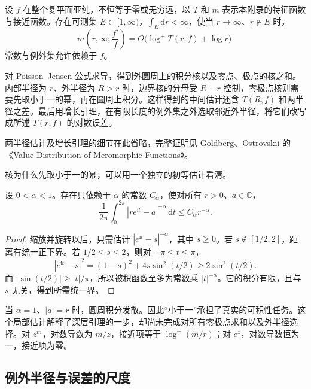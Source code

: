 \begin{lemma}\label{b3:lem:C-logarithmic-derivative}
设 \(f\) 在整个复平面亚纯，不恒等于零或无穷远，以 \(T\) 和 \(m\) 表示本附录的特征函数与接近函数。存在可测集 \(E\subset[1,\infty)\)，\(\int_E\mathrm{d}r<\infty\)，使当 \(r\to\infty\)、\(r\notin E\) 时，
\[
 m\left(r,\infty;\frac{f'}f\right)
 =O\bigl(\log^+T(r,f)+\log r\bigr).
\]
常数与例外集允许依赖于 \(f\)。
\end{lemma}
\begin{proofsketch}
对 Poisson--Jensen 公式求导，得到外圆周上的积分核以及零点、极点的核之和。内部半径为 \(r\)、外半径为 \(R>r\) 时，边界核的分母受 \(R-r\) 控制，零极点核则需要先取小于一的幂，再在圆周上积分。这样得到的中间估计还含 \(T(R,f)\) 和两半径之差。最后用增长引理，在有限长度的例外集之外选取邻近外半径，将它们改写成所述 \(T(r,f)\) 的对数误差。

两半径估计及增长引理的细节在此省略，完整证明见 Goldberg、Ostrovskii 的《Value Distribution of Meromorphic Functions》\cite[pp.~91--93]{GoldbergOstrovskii2008Value}。
\end{proofsketch}

核为什么先取小于一的幂，可以用一个独立的初等估计看清。

\begin{lemma}[圆周上的弱奇性]\label{b3:lem:C-circle-singularity}
设 \(0<\alpha<1\)。存在只依赖于 \(\alpha\) 的常数 \(C_\alpha\)，使对所有 \(r>0\)、\(a\in\mathbb C\)，
\[
 \frac1{2\pi}\int_0^{2\pi}|re^{\mathrm{i}t}-a|^{-\alpha}\,\mathrm{d}t
 \le C_\alpha r^{-\alpha}.
\]
\end{lemma}
\begin{proof}
缩放并旋转以后，只需估计 \(|e^{\mathrm{i}t}-s|^{-\alpha}\)，其中 \(s\ge0\)。若 \(s\notin[1/2,2]\)，距离有统一正下界。若 \(1/2\le s\le2\)，则对 \(-\pi\le t\le\pi\)，
\[
 |e^{\mathrm{i}t}-s|^2=(1-s)^2+4s\sin^2(t/2)
 \ge2\sin^2(t/2).
\]
而 \(|\sin(t/2)|\ge |t|/\pi\)，所以被积函数至多为常数乘 \(|t|^{-\alpha}\)。它的积分有限，且与 \(s\) 无关，得到所需统一界。
\end{proof}

当 \(\alpha=1\)、\(|a|=r\) 时，圆周积分发散。因此“小于一”承担了真实的可积性任务。这个局部估计解释了深层引理的一步，却尚未完成对所有零极点求和以及外半径选择。对 \(z^m\)，对数导数为 \(m/z\)，接近项等于 \(\log^+(m/r)\)；对 \(e^z\)，对数导数恒为一，接近项为零。

\subsection{例外半径与误差的尺度}
\label{b3:subsec:C0302}

